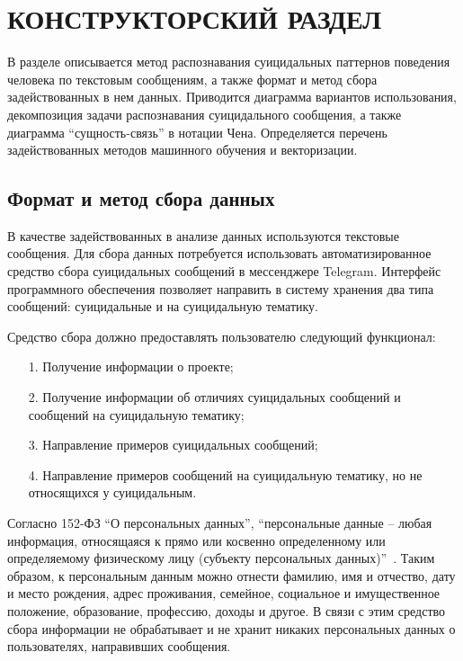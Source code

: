 \section{КОНСТРУКТОРСКИЙ РАЗДЕЛ}

В разделе описывается метод распознавания суицидальных паттернов поведения человека по текстовым сообщениям, а также формат и метод сбора задействованных в нем данных. 
Приводится диаграмма вариантов использования, декомпозиция задачи распознавания суицидального сообщения, а также диаграмма ``сущность-связь'' в нотации Чена. 
Определяется перечень задействованных методов машинного обучения и векторизации.

\subsection{Формат и метод сбора данных}

В качестве задействованных в анализе данных используются текстовые сообщения. 
Для сбора данных потребуется использовать автоматизированное средство сбора суицидальных сообщений в мессенджере Telegram. 
Интерфейс программного обеспечения позволяет направить в систему хранения два типа сообщений: суицидальные и на суицидальную тематику.

Средство сбора должно предоставлять пользователю следующий функционал:

\begin{enumerate}
\item[1.] Получение информации о проекте;
\item[2.] Получение информации об отличиях суицидальных сообщений и сообщений на суицидальную тематику;
\item[3.] Направление примеров суицидальных сообщений;
\item[4.] Направление примеров сообщений на суицидальную тематику, но не относящихся у суицидальным.
\end{enumerate}

Согласно 152-ФЗ ``О персональных данных'', ``персональные данные -- любая информация, относящаяся к прямо или косвенно определенному или определяемому физическому лицу (субъекту персональных данных)''~\cite{fzpers}. 
Таким образом, к персональным данным можно отнести фамилию, имя и отчество, дату и место рождения, адрес проживания, семейное, социальное и имущественное положение, образование, профессию, доходы и другое. 
В связи с этим средство сбора информации не обрабатывает и не хранит никаких персональных данных о пользователях, направивших сообщения.

